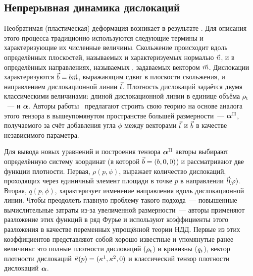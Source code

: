 \documentclass[a4paper, 14pt, titlepage]{extarticle}
\newcommand{\tot}{\textup{t}}    %
\newcommand{\plast}{\textup{pl}} %
\newcommand{\II}{\textup{II}}    %
\begin{document}
  \subsection{Непрерывная динамика дислокаций} %

  Необратимая (пластическая) деформация возникает в результате . Для описания
  этого процесса традиционно используются следующие термины и характеризующие их численные величины. Скольжение
  происходит вдоль определённых плоскостей, называемых  и
  характеризуемых нормалью $\vec{n}$, и в определённых направлениях, называемых , задаваемых вектором $\vec{m}$. Дислокации характеризуются 
  $\vec{b} = b \vec{m}$, выражающим сдвиг в плоскости скольжения, и направлением дислокационной
  линии $\vec{l}$.  Плотность дислокаций задаётся двумя классическими величинами: длиной
  дислокационной линии в единице объёма $\rho_\tot$~---  и
   $\bm{\alpha}$. %
  Авторы работы~\cite{hochrainer-cdd} предлагают строить свою теорию на основе аналога этого тензора
  в вышеупомянутом пространстве большей размерности~---  $\matx{\alpha}^\II$, получаемого за счёт добавления угла $\phi$ между векторами $\vec{l}$ и
  $\vec{b}$ в качестве независимого параметра.

  Для вывода новых уравнений и построения тензора $\matx{\alpha}^\II$ авторы выбирают определённую
  систему координат (в которой $\vec{b} = (b,0,0)$) и рассматривают две функции плотности.
  Первая, $\rho(p,\phi)$, выражает количество дислокаций, проходящих через единичный элемент площади в
  точке $p$ в направлении $\vec{l}(\varphi)$. Вторая,  $q(p,\phi)$,
  характеризует изменение направления вдоль дислокационной линии.
  Чтобы преодолеть главную проблему такого подхода~--- повышенные вычислительные затраты из-за
  увеличенной размерности~--- авторы применяют разложение этих функций в ряд Фурье и используют
  коэффициенты этого разложения в качестве переменных упрощённой теории НДД.
  Первые из этих коэффициентов представляют собой хорошо известные и упомянутые ранее величины: это
  полные плотности дислокаций ($\rho_\tot$) и кривизны ($q_\tot$), вектор плотности дислокаций
  $\vec{\kappa}(p) = (\kappa^1,\kappa^2,0)$ и классический тензор плотности дислокаций $\bm{\alpha}$.
\end{document}
